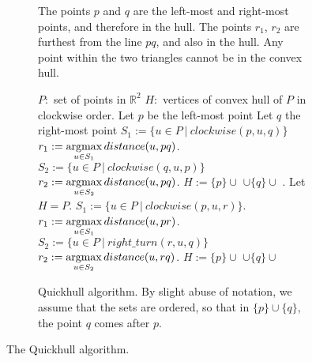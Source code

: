 \begin{figure}[ht]
\begin{subfigure}{0.45\textwidth}
{
    }
    \caption{The points $p$ and $q$ are the left-most and 
             right-most points, and therefore in the hull. The points $r_1$,
             $r_2$ are furthest from the line $pq$, and also in the hull. Any
             point within the two triangles cannot be in the convex hull.}
    \label{fig:quickhull}
    \end{subfigure}
    \hfill
    \begin{subfigure}{0.45\textwidth}
    \begin{algorithmic}[1]
        \Require $P: $ set of points in $\mathbb{R}^2$
        \Ensure $H: $ vertices of convex hull of $P$ in clockwise order.
        \State Let $p$ be the left-most point
        \State Let $q$ the right-most point
        \State $S_1 := \{u \in P \ | \ clockwise(p, u, q)\}$
        \State $r_1 := \operatorname*{argmax}\limits_{u \in S_1}distance(u, pq)$.
        \State $S_2 := \{u \in P \ | \ clockwise(q, u, p)\}$
        \State $r_2 := \operatorname*{argmax}\limits_{u \in S_2}distance(u, pq)$.
        \State $H := \{p\} \cup $ 
                $\cup \{q\} \cup$ .
                \State Let $H = P$.
            \Else{}
                \State $S_1 := \{u \in P \ | \ clockwise(p, u, r)\}$.
                \State $r_1 := \operatorname*{argmax}\limits_{u \in S_1}distance(u, pr)$.
                \State $S_2 := \{u \in P \ | \ right\_turn(r, u, q)\}$
                \State $r_2 := \operatorname*{argmax}\limits_{u \in S_2}distance(u, rq)$.
                \State $H := \{p\} \cup $ 
                       $\cup \{q\} \cup$ 
            \EndIf
        \EndFunction
    \caption{Quickhull algorithm. By slight abuse of notation, we assume that 
             the sets are ordered, so that in $\{p\} \cup \{q\}$,
             the point $q$ comes after $p$.}
    \label{alg:quickhull_basic}
    \end{algorithmic}
    \end{subfigure}
    \caption{The Quickhull algorithm. }
\end{figure}

